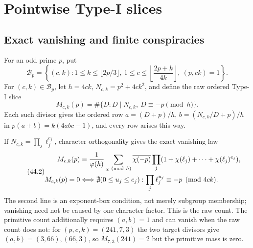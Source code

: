 \documentclass[10pt,reqno]{amsart}
\theoremstyle{definition}
\newcommand{\1}{\mathbf 1}
\begin{document}
\section{Pointwise Type-I slices}\label{sec:slices}
\subsection{Exact vanishing and finite conspiracies}
For an odd prime $p$, put
\[
 \mathcal B_p=\left\{(c,k):1\leq k\leq\lfloor2p/3\rfloor,
  \ 1\leq c\leq\left\lfloor\frac{2p+k}{4k}\right\rfloor,
  \ (p,ck)=1\right\}.
\]
For $(c,k)\in\mathcal B_p$, let $h=4ck$,
$N_{c,k}=p^2+4ck^2$, and define the raw ordered Type-I slice
\begin{equation}\tag{44.1}
 M_{c,k}(p)=\#\{D:D\mid N_{c,k},\ D\equiv-p\pmod h\}.
\end{equation}
Each such divisor gives the ordered row
$a=(D+p)/h$, $b=(N_{c,k}/D+p)/h$ in
$p(a+b)=k(4abc-1)$, and every row arises this way.

If $N_{c,k}=\prod_j\ell_j^{e_j}$, character orthogonality gives the exact
vanishing law
\begin{equation}\tag{44.2}
 \begin{split}
 M_{c,k}(p)
 &=\frac1{\varphi(h)}\sum_{\chi\ ({\rm mod}\ h)}
   \overline{\chi(-p)}
   \prod_j(1+\chi(\ell_j)+\cdots+\chi(\ell_j)^{e_j}),\\
 M_{c,k}(p)=0
 &\Longleftrightarrow
 \nexists(0\leq u_j\leq e_j):
       \prod_j\ell_j^{u_j}\equiv-p\pmod{4ck}.
 \end{split}
\end{equation}
The second line is an exponent-box condition, not merely subgroup
membership; vanishing need not be caused by one character factor.  This is
the raw count.  The primitive count additionally requires $(a,b)=1$ and can
vanish when the raw count does not: for $(p,c,k)=(241,7,3)$ the two target
divisors give $(a,b)=(3,66),(66,3)$, so $M_{7,3}(241)=2$ but the primitive
mass is zero.
\end{document}
